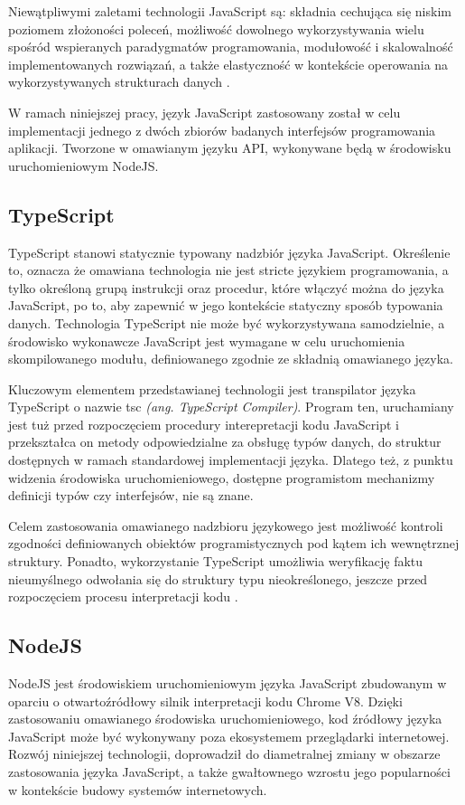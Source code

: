 Niewątpliwymi zaletami technologii JavaScript są: składnia cechująca się niskim poziomem złożoności poleceń, możliwość dowolnego wykorzystywania wielu spośród wspieranych paradygmatów programowania, modułowość i skalowalność implementowanych rozwiązań, a także elastyczność w kontekście operowania na wykorzystywanych strukturach danych \cite{jensen2009type}.

W ramach niniejszej pracy, język JavaScript zastosowany został w celu implementacji jednego z dwóch zbiorów badanych interfejsów programowania aplikacji. Tworzone w omawianym języku API, wykonywane będą w środowisku uruchomieniowym NodeJS.
\subsection*{TypeScript}
TypeScript stanowi statycznie typowany nadzbiór języka JavaScript. Określenie to, oznacza że omawiana technologia nie jest stricte językiem programowania, a tylko określoną grupą instrukcji oraz procedur, które włączyć można do języka JavaScript, po to, aby zapewnić w jego kontekście statyczny sposób typowania danych. Technologia TypeScript nie może być wykorzystywana samodzielnie, a środowisko wykonawcze JavaScript jest wymagane w celu uruchomienia skompilowanego modułu, definiowanego zgodnie ze składnią omawianego języka.

Kluczowym elementem przedstawianej technologii jest transpilator języka TypeScript o nazwie tsc \textit{(ang. TypeScript Compiler)}. Program ten, uruchamiany jest tuż przed rozpoczęciem procedury interepretacji kodu JavaScript i przekształca on metody odpowiedzialne za obsługę typów danych, do struktur dostępnych w ramach standardowej implementacji języka. Dlatego też, z punktu widzenia środowiska uruchomieniowego, dostępne programistom mechanizmy definicji typów czy interfejsów, nie są znane.

Celem zastosowania omawianego nadzbioru językowego jest możliwość kontroli zgodności definiowanych obiektów programistycznych pod kątem ich wewnętrznej struktury. Ponadto, wykorzystanie TypeScript umożliwia weryfikację faktu nieumyślnego odwołania się do struktury typu nieokreślonego, jeszcze przed rozpoczęciem procesu interpretacji kodu \cite{bierman2014understanding}.
\subsection*{NodeJS}
NodeJS jest środowiskiem uruchomieniowym języka JavaScript zbudowanym w oparciu o otwartoźródłowy silnik interpretacji kodu Chrome V8. Dzięki zastosowaniu omawianego środowiska uruchomieniowego, kod źródłowy języka JavaScript może być wykonywany poza ekosystemem przeglądarki internetowej. Rozwój niniejszej technologii, doprowadził do diametralnej zmiany w obszarze zastosowania języka JavaScript, a także gwałtownego wzrostu jego popularności w kontekście budowy systemów internetowych.

